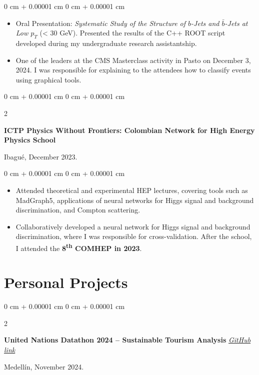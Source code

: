 \documentclass[10pt, letterpaper]{article}
\newenvironment{highlights}{
    \begin{itemize}[
        topsep=0.10 cm,
        parsep=0.10 cm,
        partopsep=0pt,
        itemsep=0pt,
        leftmargin=0 cm + 10pt
    ]
}{
    \end{itemize}
}
\newenvironment{onecolentry}{
    \begin{adjustwidth}{
        0 cm + 0.00001 cm
    }{
        0 cm + 0.00001 cm
    }
}{
    \end{adjustwidth}
}
\newenvironment{twocolentry}[2][]{
    \onecolentry
    \def\secondColumn{#2}
    \setcolumnwidth{\fill, 4.5 cm}
    \begin{paracol}{2}
}{
    \switchcolumn \raggedleft \secondColumn
    \end{paracol}
    \endonecolentry
}
\begin{document}
    \vspace{0.10 cm}
    \begin{onecolentry}
        \begin{highlights}
            \item Oral Presentation: \textit{Systematic Study of the Structure of \(b\)-Jets and \(\bar{b}\)-Jets at Low \(p_T\)} (< 30 GeV). Presented the results of the C++ ROOT script developed during my undergraduate research assistantship.
            \item One of the leaders at the CMS Masterclass activity in Pasto on December 3, 2024. I was responsible for explaining to the attendees how to classify events using graphical tools.
        \end{highlights}
    \end{onecolentry}

    \vspace{0.2 cm}
    \begin{twocolentry}{
        Ibagué, December 2023.
    }
        \textbf{ICTP Physics Without Frontiers: Colombian Network for High Energy Physics School}
    \end{twocolentry}

    \vspace{0.10 cm}
    \begin{onecolentry}
        \begin{highlights}
            \item Attended theoretical and experimental HEP lectures, covering tools such as MadGraph5, applications of neural networks for Higgs signal and background discrimination, and Compton scattering.
            \item Collaboratively developed a neural network for Higgs signal and background discrimination, where I was responsible for cross-validation. After the school, I attended the \textbf{8\textsuperscript{th} COMHEP in 2023}.
        \end{highlights}
    \end{onecolentry}

    \section{Personal Projects}
    \begin{twocolentry}{
        Medellín, November 2024.
    }
        \textbf{United Nations Datathon 2024 -- Sustainable Tourism Analysis} 
        \textit{\href{https://github.com/JuanJ27/UN-Datathon-sisifos}{GitHub link}}
    \end{twocolentry}
\end{document}
